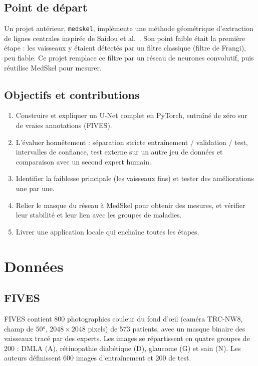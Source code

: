 \documentclass[11pt,a4paper]{article}
\begin{document}
\subsection{Point de départ}
Un projet antérieur, \texttt{medskel}, implémente une méthode géométrique d'extraction de lignes centrales inspirée de Saidou et al.\ \cite{saidou}. Son point faible était la première étape : les vaisseaux y étaient détectés par un filtre classique (filtre de Frangi), peu fiable. Ce projet remplace ce filtre par un réseau de neurones convolutif, puis réutilise MedSkel pour mesurer.

\subsection{Objectifs et contributions}
\begin{enumerate}
  \item Construire et expliquer un U-Net complet en PyTorch, entraîné de zéro sur de vraies annotations (FIVES).
  \item L'évaluer honnêtement : séparation stricte entraînement / validation / test, intervalles de confiance, test externe sur un autre jeu de données et comparaison avec un second expert humain.
  \item Identifier la faiblesse principale (les vaisseaux fins) et tester des améliorations une par une.
  \item Relier le masque du réseau à MedSkel pour obtenir des mesures, et vérifier leur stabilité et leur lien avec les groupes de maladies.
  \item Livrer une application locale qui enchaîne toutes les étapes.
\end{enumerate}

\section{Données}

\subsection{FIVES}
FIVES \cite{fives} contient 800 photographies couleur du fond d'œil (caméra TRC-NW8, champ de 50°, $2048\times2048$ pixels) de 573 patients, avec un masque binaire des vaisseaux tracé par des experts. Les images se répartissent en quatre groupes de 200 : DMLA (A), rétinopathie diabétique (D), glaucome (G) et sain (N). Les auteurs définissent 600 images d'entraînement et 200 de test.
\end{document}
